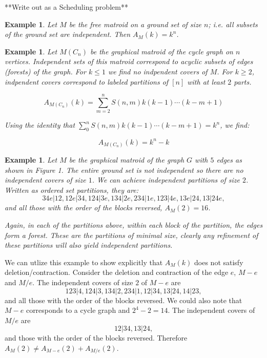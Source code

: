 \documentclass[12pt,reqno]{amsart}
\numberwithin{definition}{section}
\newtheorem{example}[definition]{Example}
\begin{document}
**Write out as a  Scheduling problem**

\begin{example}

Let $M$ be the free matroid on a ground set of size $n$; i.e. all subsets of the ground set are independent.  Then $A_M(k) = k^n$.  

\end{example}

\begin{example}

Let $M(C_n)$ be the graphical matroid of the cycle graph on $n$
vertices.  Independent sets of this matroid correspond to acyclic
subsets of edges (forests) of the graph.  For $k \leq 1$ we find no
indpendent covers of $M$.  For $k \geq 2$, indpendent covers
correspond to labeled partitions of $[n]$ with at least $2$ parts.

$$A_{M(C_n)}(k) = \sum_{m=2}^{n} S(n,m) k(k-1) \cdots (k-m+1) $$

Using the identity that $\sum_0^n S(n,m) k(k-1) \cdots (k-m+1) = k^n$, we find:

$$A_{M(C_n)}(k) = k^n - k $$

\end{example}



\begin{example}
Let $M$ be the graphical matroid of the graph $G$ with $5$ edges as
shown in Figure 1.  The entire ground set is not independent so there
are no independent covers of size $1$.  We can achieve independent
partitions of size $2$.  Written as ordered set partitions, they are:
$$ 34e|12, 12e|34, 124|3e, 134|2e, 234|1e, 123|4e, 13e|24, 13|24e, $$
and all those with the order of the blocks reversed, $A_M(2) = 16$.  

Again, in each of the partitions above, within each block of the
partition, the edges form a forest.  These are the partitions of
minimal size, clearly any refinement of these partitions will also
yield independent partitions.

\end{example}

We can utlize this example to show explicitly that $A_M(k)$ does not
satisfy deletion/contraction.  Consider the deletion and contraction
of the edge $e$, $M-e$ and $M/e$.  The independent covers of size $2$
of $M-e$ are
$$ 123|4, 124|3, 134|2, 234|1, 12|34, 13|24, 14|23, $$ and all those
with the order of the blocks reversed.  We could also note that $M-e$
corresponds to a cycle graph and $2^4 - 2 = 14$.  The independent
covers of $M/e$ are $$12|34, 13|24,$$ and those with the order of the
blocks reversed.  Therefore $A_M(2) \neq A_{M-e}(2) + A_{M/e}(2)$.
\end{document}
